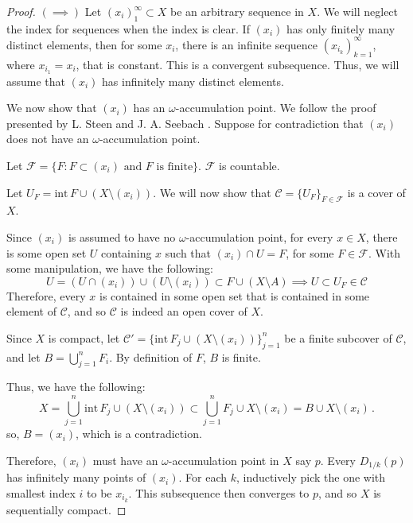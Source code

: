 \documentclass[openany, amssymb, psamsfonts]{amsart}
\theoremstyle{definition}
\numberwithin{equation}{section}
\begin{document}
\begin{proof}[Proof]
  $(\implies)$ Let $(x_i)_1^\infty\subset X$ be an arbitrary sequence in $X$. We will neglect the index for sequences when the index is clear. If $(x_i)$ has only finitely many distinct elements, then for some $x_i$, there is an infinite sequence $(x_{i_k})_{k=1}^\infty$, where $x_{i_1} = x_i$, that is constant. This is a convergent subsequence. Thus, we will assume that $(x_i)$ has infinitely many distinct elements. 

  We now show that $(x_i)$ has an $\omega$-accumulation point. We follow the proof presented by L. Steen and J. A. Seebach \cite{c-e top}. Suppose for contradiction that $(x_i)$ does not have an $\omega$-accumulation point.

  Let $\mathcal{F} = \{F: F\subset (x_i) \text{ and } F \text{ is finite}\}$. $\mathcal{F}$ is countable. 
  
  Let $U_F = \mathrm{int\,} F\cup (X \setminus (x_i))$. We will now show that $\mathcal{C} = \{U_F\}_{F\in \mathcal{F}}$ is a cover of $X$.

  Since $(x_i)$ is assumed to have no $\omega$-accumulation point, for every $x \in X$, there is some open set $U$ containing $x$ such that $(x_i) \cap U = F$, for some $F \in \mathcal{F}$. With some manipulation, we have the following:
  \begin{equation*}
    U = (U \cap (x_i)) \cup (U \setminus (x_i)) \subset F \cup (X \setminus A)\implies U \subset U_F \in \mathcal{C}
  \end{equation*}
  Therefore, every $x$ is contained in some open set that is contained in some element of $\mathcal{C}$, and so $\mathcal{C}$ is indeed an open cover of $X$.

  Since $X$ is compact, let $\mathcal{C}' = \{\mathrm{int\,} F_j \cup (X \setminus (x_i))\}_{j=1}^n$ be a finite subcover of $\mathcal{C}$, and let $B = \bigcup_{j=1}^n F_i$. By definition of $F$, $B$ is finite.

  Thus, we have the following:
  \begin{equation*}
    X = \bigcup_{j=1}^n \mathrm{int\,} F_j\cup (X\setminus (x_i)) \subset \bigcup_{j=1}^n F_j \cup X \setminus (x_i) = B \cup X \setminus (x_i)\, .
  \end{equation*}
  so, $B = (x_i)$, which is a contradiction. 

  Therefore, $(x_i)$ must have an $\omega$-accumulation point in $X$ say $p$. Every $D_{1/k}(p)$ has infinitely many points of $(x_i)$. For each $k$, inductively pick the one with smallest index $i$ to be $x_{i_k}$. This subsequence then converges to $p$, and so $X$ is sequentially compact. 


\end{proof}
\end{document}
